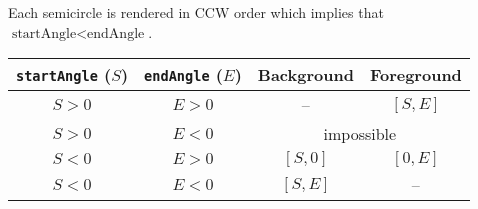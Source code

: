 \documentclass{article}
\begin{document}
Each semicircle is rendered in CCW order which implies that $\text{startAngle} < \text{endAngle}$.

\begin{tabular}{cccc}
    \toprule
    \verb|startAngle| ($S$) & \verb|endAngle| ($E$) & Background                     & Foreground \\
    \midrule
    $S> 0$                       & $E> 0$                       & --                             & $[S,E]$    \\
    $S>0$                        & $E<0$                        & \multicolumn{2}{c}{impossible}              \\
    $S< 0$                       & $E> 0$                       & $[S,0]$                        & $[0,E]$    \\
    $S< 0$                       & $E< 0$                       & $[S,E]$                        & --         \\
    \bottomrule
\end{tabular}
\end{document}
